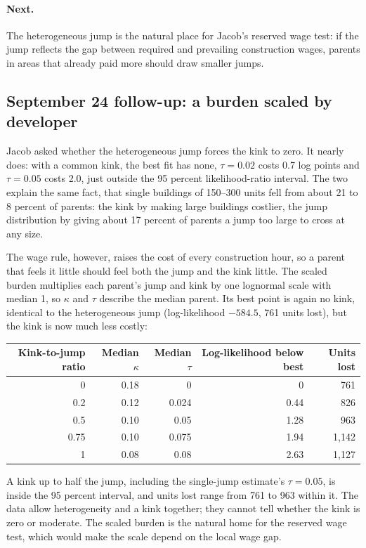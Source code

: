 \paragraph{Next.} The heterogeneous jump is the natural place for Jacob's
reserved wage test: if the jump reflects the gap between required and
prevailing construction wages, parents in areas that already paid more should
draw smaller jumps.

\subsection*{September 24 follow-up: a burden scaled by developer}

Jacob asked whether the heterogeneous jump forces the kink to zero. It
nearly does: with a common kink, the best fit has none, $\tau=0.02$ costs 0.7
log points and $\tau=0.05$ costs 2.0, just outside the 95 percent
likelihood-ratio interval. The two explain the same fact, that single
buildings of 150--300 units fell from about 21 to 8 percent of parents: the
kink by making large buildings costlier, the jump distribution by giving about
17 percent of parents a jump too large to cross at any size.

The wage rule, however, raises the cost of every construction hour, so a
parent that feels it little should feel both the jump and the kink little. The
scaled burden multiplies each parent's jump and kink by one lognormal scale
with median 1, so $\kappa$ and $\tau$ describe the median parent. Its best
point is again no kink, identical to the heterogeneous jump (log-likelihood
$-584.5$, 761 units lost), but the kink is now much less costly:

\begin{center}
\small
\begin{tabular}{rrrrr}
\hline
Kink-to-jump ratio & Median $\kappa$ & Median $\tau$ & Log-likelihood below best & Units lost \\
\hline
0 & 0.18 & 0 & 0 & 761 \\
0.2 & 0.12 & 0.024 & 0.44 & 826 \\
0.5 & 0.10 & 0.05 & 1.28 & 963 \\
0.75 & 0.10 & 0.075 & 1.94 & 1,142 \\
1 & 0.08 & 0.08 & 2.63 & 1,127 \\
\hline
\end{tabular}
\end{center}

A kink up to half the jump, including the single-jump estimate's
$\tau=0.05$, is inside the 95 percent interval, and units lost range from 761
to 963 within it. The data allow heterogeneity and a kink together; they
cannot tell whether the kink is zero or moderate. The scaled burden is the
natural home for the reserved wage test, which would make the scale depend on
the local wage gap.
